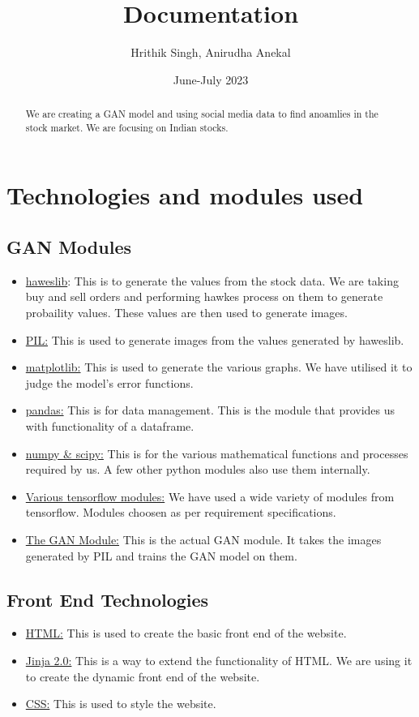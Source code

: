 \documentclass{article}
\begin{document}
\title{Documentation}
\author{Hrithik Singh, Anirudha Anekal}
\date{June-July 2023}
\maketitle
\begin{abstract}
We are creating a GAN model and using social media data to find anoamlies in the stock market. We are focusing on Indian stocks.
\end{abstract}
\section{Technologies and modules used}
\subsection{GAN Modules}
\begin{itemize}
\item \underline{haweslib}: This is to generate the values from the stock data. We are taking buy and sell orders and performing hawkes process on them to generate probaility values. These values are then used to generate images.
\item \underline{PIL:} This is used to generate images from the values generated by haweslib.
\item \underline{matplotlib:} This is used to generate the various graphs. We have utilised it to judge the model's error functions.
\item \underline{pandas:} This is for data management. This is the module that provides us with functionality of a dataframe.
\item \underline{numpy \& scipy:} This is for the various mathematical functions and processes required by us. A few other python modules also use them internally.
\item \underline{Various tensorflow modules:} We have used a wide variety of modules from tensorflow. Modules choosen as per requirement specifications.
\item \underline{The GAN Module:} This is the actual GAN module. It takes the images generated by PIL and trains the GAN model on them.
\end{itemize}
\subsection{Front End Technologies}
\begin{itemize}
\item \underline{HTML:} This is used to create the basic front end of the website.
\item \underline{Jinja 2.0:} This is a way to extend the functionality of HTML. We are using it to create the dynamic front end of the website.
\item \underline{CSS:} This is used to style the website.
\end{itemize}
\end{document}
